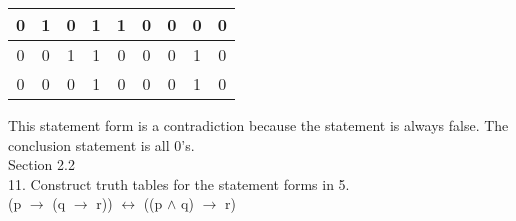 \documentclass{article}
\begin{document}
\begin{table}[h]
\begin{tabular}{|c|c|c|c|c|c|c|c|c|}
0 & 1 & 0 & 1       & 1                           & 0                     & 0                                                                       & 0       & 0                                                                                                   \\ \hline
0 & 0 & 1 & 1       & 0                           & 0                     & 0                                                                       & 1       & 0                                                                                                   \\ \hline
0 & 0 & 0 & 1       & 0                           & 0                     & 0                                                                       & 1       & 0                                                                                                   \\ \hline
\end{tabular}
\end{table}

This statement form is a contradiction because the statement is always false. The conclusion statement is all 0's. \\

Section 2.2\\
11. Construct truth tables for the statement forms in 5. \\
(p $\rightarrow$ (q $\rightarrow$ r)) $\leftrightarrow$ ((p $\wedge$  q) $\rightarrow$ r)
\end{document}
